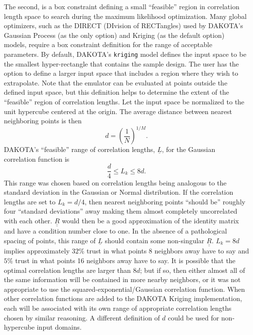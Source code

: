 The second, is a box constraint defining a small ``feasible'' region in
correlation length space to search during the maximum likelihood 
optimization.  Many global optimizers, such as the DIRECT (DIvision of 
RECTangles) used by DAKOTA's Gaussian Process (as the only option) and 
Kriging (as the default option) models, require a box constraint definition for
the range of acceptable parameters.  By default, DAKOTA's \texttt{kriging} 
model defines the input space to be the smallest hyper-rectangle that 
contains the sample design. The user has the option to define a larger 
input space that includes a region where they wish to extrapolate.  Note 
that the emulator can be evaluated at points outside the defined input 
space, but this definition helps to determine the extent of the 
``feasible'' region of correlation lengths.  Let the input space be 
normalized to the unit hypercube centered at the origin. The average 
distance between nearest neighboring points is then
\begin{displaymath}
d=\left(\frac{1}{N}\right)^{1/M}.
\end{displaymath}
DAKOTA's ``feasible'' range of correlation lengths, $\underline{L}$, for 
the Gaussian correlation function is
\begin{displaymath}
\frac{d}{4}\le L_k \le 8d.
\end{displaymath}
This range was chosen based on correlation lengths being analogous to 
the standard deviation in the Gaussian or Normal distribution.  If the 
correlation lengths are set to $L_k=d/4$, then nearest neighboring points 
``should be'' roughly four ``standard deviations'' away making them almost 
completely uncorrelated with each other. $\underline{\underline{R}}$ would 
then be a good approximation of the identity matrix and have a condition 
number close to one.  In the absence of a pathological spacing of points, 
this range of  $\underline{L}$ should contain some non-singular 
$\underline{\underline{R}}$.   $L_k=8d$ implies approximately  $32\%$ trust 
in what points 8 neighbors away have to say and $5\%$ trust in what points 
16 neighbors away have to say. It is possible that the optimal correlation 
lengths are larger than $8d$; but if so, then either almost all of the same 
information will be contained in more nearby neighbors, or it was not 
appropriate to use the squared-exponential/Gaussian correlation function.  
When other correlation functions are added to the DAKOTA Kriging 
implementation, each will be associated with its own range of appropriate 
correlation lengths chosen by similar reasoning.  A different definition of 
$d$ could be used for non-hypercube input domains.

